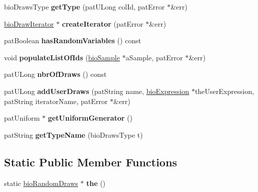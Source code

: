 \begin{DoxyCompactItemize}
bio\+Draws\+Type {\bfseries get\+Type} (pat\+U\+Long col\+Id, pat\+Error $\ast$\&err)
\item 
\mbox{\label{classbio_random_draws_ae14eaa6840dc9733c3d6f0c9d14aefb9}} 
\hyperlink{classbio_draw_iterator}{bio\+Draw\+Iterator} $\ast$ {\bfseries create\+Iterator} (pat\+Error $\ast$\&err)
\item 
\mbox{\label{classbio_random_draws_aeefeee8931a4e79bbc25fc3f45123911}} 
pat\+Boolean {\bfseries has\+Random\+Variables} () const
\item 
\mbox{\label{classbio_random_draws_a0cda334bd78c05ac8df166640382682b}} 
void {\bfseries populate\+List\+Of\+Ids} (\hyperlink{classbio_sample}{bio\+Sample} $\ast$a\+Sample, pat\+Error $\ast$\&err)
\item 
\mbox{\label{classbio_random_draws_a4b424d6359f6f9662af0beaaf644a3fa}} 
pat\+U\+Long {\bfseries nbr\+Of\+Draws} () const
\item 
\mbox{\label{classbio_random_draws_a5a31ec707e43173b7bd763489b577981}} 
pat\+U\+Long {\bfseries add\+User\+Draws} (pat\+String name, \hyperlink{classbio_expression}{bio\+Expression} $\ast$the\+User\+Expression, pat\+String iterator\+Name, pat\+Error $\ast$\&err)
\item 
\mbox{\label{classbio_random_draws_ab1a5dbaf36a111a04696cb9813f3d5a7}} 
pat\+Uniform $\ast$ {\bfseries get\+Uniform\+Generator} ()
\item 
\mbox{\label{classbio_random_draws_a87c762571e4af459519baa69e91fe519}} 
pat\+String {\bfseries get\+Type\+Name} (bio\+Draws\+Type t)
\end{DoxyCompactItemize}
\subsection*{Static Public Member Functions}
\begin{DoxyCompactItemize}
\item 
\mbox{\label{classbio_random_draws_af39c679577d6e75c0ad0de0583620e7c}} 
static \hyperlink{classbio_random_draws}{bio\+Random\+Draws} $\ast$ {\bfseries the} ()
\end{DoxyCompactItemize}
